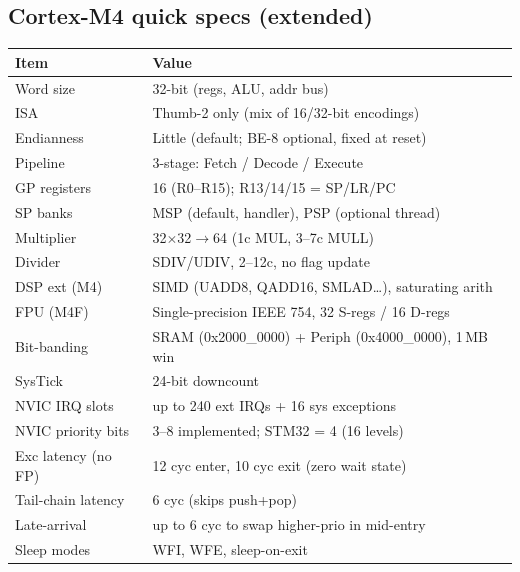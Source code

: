 \subsection{Cortex-M4 quick specs (extended)}
\begin{tabular}{@{}lp{}@{}}
\toprule
Item & Value \\
\midrule
Word size           & 32-bit (regs, ALU, addr bus) \\
ISA                 & Thumb-2 only (mix of 16/32-bit encodings) \\
Endianness          & Little (default; BE-8 optional, fixed at reset) \\
Pipeline            & 3-stage: Fetch / Decode / Execute \\
GP registers        & 16 (R0--R15); R13/14/15 = SP/LR/PC \\
SP banks            & MSP (default, handler), PSP (optional thread) \\
Multiplier          & 32$\times$32$\to$64 (1c MUL, 3--7c MULL) \\
Divider             & SDIV/UDIV, 2--12c, no flag update \\
DSP ext (M4)        & SIMD (UADD8, QADD16, SMLAD\dots), saturating arith \\
FPU (M4F)           & Single-precision IEEE 754, 32 S-regs / 16 D-regs \\
Bit-banding         & SRAM (0x2000\_0000) + Periph (0x4000\_0000), 1\,MB win \\
SysTick             & 24-bit downcount \\
NVIC IRQ slots      & up to 240 ext IRQs + 16 sys exceptions \\
NVIC priority bits  & 3--8 implemented; STM32 = 4 (16 levels) \\
Exc latency (no FP) & 12 cyc enter, 10 cyc exit (zero wait state) \\
Tail-chain latency  & 6 cyc (skips push+pop) \\
Late-arrival        & up to 6 cyc to swap higher-prio in mid-entry \\
Sleep modes         & WFI, WFE, sleep-on-exit \\
\bottomrule
\end{tabular}

